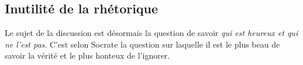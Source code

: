 
\subsection*{Inutilité de la rhétorique}

Le sujet de la discussion est désormais la question de savoir \emph{qui est heureux et qui ne l'est pas}. C'est selon Socrate la question sur laquelle il est le plus beau de savoir la vérité et le plus honteux de l'ignorer.



